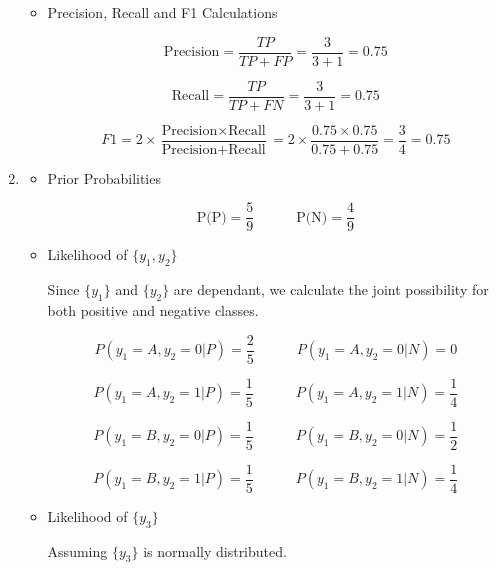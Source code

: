 \documentclass[12pt]{article}
\begin{document}
\begin{enumerate}[leftmargin=\labelsep, label=\textbf{\arabic*.)}]
\begin{itemize}
                    \vspace{1.5em}

              \item Precision, Recall and F1 Calculations

                    \[
                        \text{Precision} = \frac{TP}{TP + FP} = \frac{3}{3 + 1} = 0.75
                    \]

                    \[
                        \text{Recall} = \frac{TP}{TP + FN} = \frac{3}{3 + 1} = 0.75
                    \]

                    \[
                        F1 = 2 \times \frac{\text{Precision} \times \text{Recall}}{\text{Precision} + \text{Recall}} = 2 \times \frac{0.75 \times 0.75}{0.75 + 0.75} = \frac{3}{4} = 0.75
                    \]

          \end{itemize}
    \item \begin{itemize}
              \item Prior Probabilities

                    \[
                        \text{P(P)} = \frac{5}{9} \quad \quad \quad \text{P(N)} = \frac{4}{9}
                    \]

              \item Likelihood of $\{y_1, y_2\}$

                    Since $\{y_1\}$ and $\{y_2\}$ are dependant, we calculate the joint possibility for both positive and negative classes.

                    \[
                        P(y_1 = A, y_2 = 0 | P) = \frac{2}{5} \quad \quad \quad P(y_1 = A, y_2 = 0 | N) = 0
                    \]

                    \[
                        P(y_1 = A, y_2 = 1 | P) = \frac{1}{5} \quad \quad \quad P(y_1 = A, y_2 = 1 | N) = \frac{1}{4}
                    \]

                    \[
                        P(y_1 = B, y_2 = 0 | P) = \frac{1}{5} \quad \quad \quad P(y_1 = B, y_2 = 0 | N) = \frac{1}{2}
                    \]

                    \[
                        P(y_1 = B, y_2 = 1 | P) = \frac{1}{5} \quad \quad \quad P(y_1 = B, y_2 = 1 | N) = \frac{1}{4}
                    \]

              \item Likelihood of $\{y_3\}$

                    Assuming $\{y_3\}$ is normally distributed.


\end{itemize}
\end{enumerate}
\end{document}
